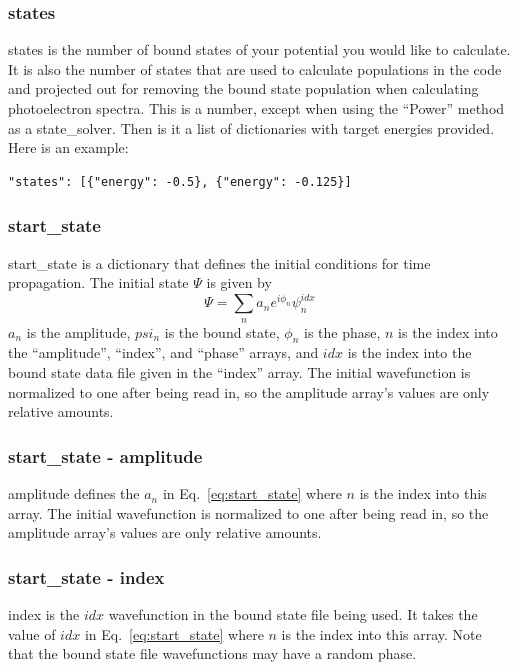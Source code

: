 \documentclass{article}
\begin{document}
\subsubsection{states}
states is the number of bound states of your potential you would like to calculate. It is also the number of states that are used to calculate populations in the code and projected out for removing the bound state population when calculating photoelectron spectra. This is a number, except when using the ``Power'' method as a state\_solver. Then is it a list of dictionaries with target energies provided. Here is an example:
\begin{verbatim}
"states": [{"energy": -0.5}, {"energy": -0.125}]
\end{verbatim}

\subsubsection{start\_state}
start\_state is a dictionary that defines the initial conditions for time propagation. The initial state $\Psi$ is given by
\begin{equation}
  \Psi = \sum\limits_n a_n e^{i\phi_n} \psi_n^{idx}
  \label{eq:start_state}
\end{equation}
$a_n$ is the amplitude, $psi_n$ is the bound state, $\phi_n$ is the phase, $n$ is the index into the ``amplitude'', ``index'', and ``phase'' arrays, and $idx$ is the index into the bound state data file given in the ``index'' array. The initial wavefunction is normalized to one after being read in, so the amplitude array's values are only relative amounts.

\subsubsection{start\_state - amplitude}
amplitude defines the $a_n$ in Eq.~\ref{eq:start_state} where $n$ is the index into this array. The initial wavefunction is normalized to one after being read in, so the amplitude array's values are only relative amounts.

\subsubsection{start\_state - index}
index is the $idx$ wavefunction in the bound state file being used. It takes the value of $idx$ in Eq.~\ref{eq:start_state} where $n$ is the index into this array. Note that the bound state file wavefunctions may have a random phase.
\end{document}
